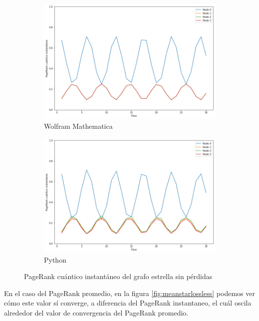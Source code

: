 \begin{figure}[H]
    \centering
    \begin{subfigure}[m]{0.45\textwidth}
        \centering
        \includegraphics[width=0.9\linewidth]{img/star-inst-M.png}
        \caption{Wolfram Mathematica}
    \end{subfigure}
    \begin{subfigure}[m]{0.45\textwidth}
        \centering
        \includegraphics[width=0.9\linewidth]{img/star-inst-lossless.png}
        \caption{Python}
    \end{subfigure}
    \caption[PageRank cuántico instantáneo del grafo estrella sin pérdidas]{PageRank cuántico instantáneo del grafo estrella sin pérdidas}
    \label{fig:inststarlossless}
\end{figure}

En el caso del PageRank promedio, en la figura \ref{fig:meanstarlossless} podemos ver cómo este valor sí converge, a diferencia del PageRank instantaneo, el cuál oscila alrededor del valor de convergencia del PageRank promedio.

